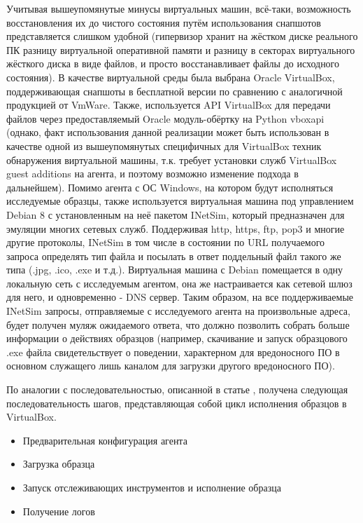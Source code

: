Учитывая вышеупомянутые минусы виртуальных машин, всё-таки, возможность восстановления их до чистого состояния путём использования снапшотов представляется слишком удобной (гипервизор хранит на жёстком диске реального ПК разницу виртуальной оперативной памяти и разницу в секторах виртуального жёсткого диска в виде файлов, и просто восстанавливает файлы до исходного состояния). В качестве виртуальной среды была выбрана Oracle VirtualBox, поддерживающая снапшоты в бесплатной версии по сравнению с аналогичной продукцией от VmWare. Также, используется API VirtualBox для передачи файлов через предоставляемый Oracle модуль-обёртку на Python vboxapi (однако, факт использования данной реализации может быть использован в качестве одной из вышеупомянутых специфичных для VirtualBox техник обнаружения виртуальной машины, т.к. требует установки служб VirtualBox guest additions на агента, и поэтому возможно изменение подхода в дальнейшем). Помимо агента с ОС Windows, на котором будут исполняться исследуемые образцы, также используется виртуальная машина под управлением Debian 8 с установленным на неё пакетом INetSim, который предназначен для эмуляции многих сетевых служб. Поддерживая http, https, ftp, pop3 и многие другие протоколы, INetSim в том числе в состоянии по URL получаемого запроса определять тип файла и посылать в ответ поддельный файл такого же типа (.jpg, .ico, .exe и т.д.). Виртуальная машина с Debian помещается в одну локальную сеть с исследуемым агентом, она же настраивается как сетевой шлюз для него, и одновременно - DNS сервер. Таким образом, на все поддерживаемые INetSim запросы, отправляемые с исследуемого агента на произвольные адреса, будет получен муляж ожидаемого ответа, что должно позволить собрать больше информации о действиях образцов (например, скачивание и запуск образцового .exe файла свидетельствует о поведении, характерном для вредоносного ПО в основном служащего лишь каналом для загрузки другого вредоносного ПО).

По аналогии с последовательностью, описанной в статье \cite {MASSMALWARE}, получена следующая последовательность шагов, представляющая собой цикл исполнения образцов в VirtualBox.

\begin {itemize}
	\item Предварительная конфигурация агента
	\item Загрузка образца
	\item Запуск отслеживающих инструментов и исполнение образца
	\item Получение логов
\end {itemize}

